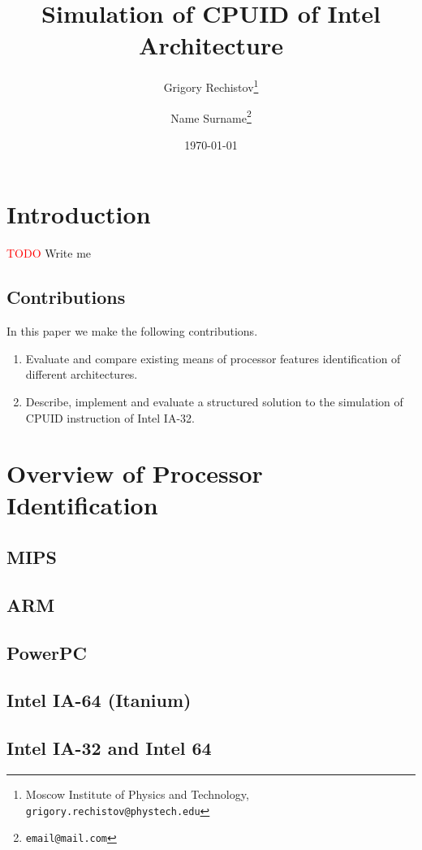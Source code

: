 \documentclass[a4paper,10pt,oneside,unicode]{article}
\author{Grigory Rechistov\thanks{Moscow Institute of Physics and Technology, \texttt{grigory.rechistov@phystech.edu}} \and Name Surname\thanks{\texttt{email@mail.com}}}
\title{Simulation of CPUID of Intel Architecture}
\date{\today}
\newcommand{\todo}[1][]{\textcolor{red}{TODO #1}}
\begin{document}
\maketitle

\tableofcontents

\section {Introduction}

\todo{Write me}

\subsection{Contributions}
In this paper we make the following contributions.
\begin{enumerate}
\item Evaluate and compare existing means of processor features identification of different architectures.
\item Describe, implement and evaluate a structured solution to the simulation of CPUID instruction of Intel IA-32.
\end{enumerate}

\section{Overview of Processor Identification}

\subsection{MIPS}
\subsection{ARM}
\subsection{PowerPC}

\subsection{Intel IA-64 (Itanium)}

\cite{itanium-sdm}

\subsection{Intel IA-32 and Intel 64}
\end{document}
